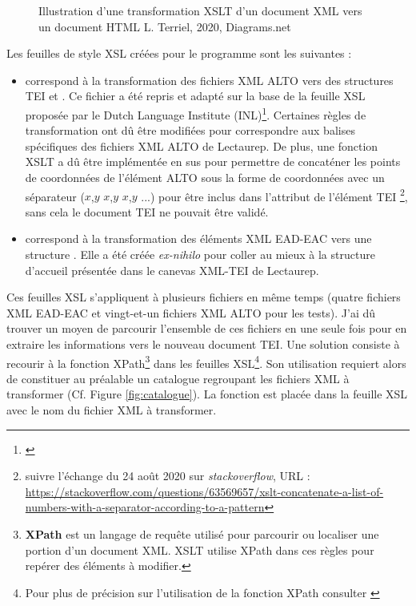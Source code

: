 \begin{figure}[h!]
    \centering
    \centerline{}
    \caption{Illustration d'une transformation XSLT d'un document XML vers un document HTML  \textcopyright L. Terriel, 2020, Diagrams.net}
    \label{fig:example_XSLT}
\end{figure}
\newpage
Les feuilles de style XSL créées pour le programme sont les suivantes : 
\begin{itemize}
    \item {} correspond à la transformation des fichiers XML ALTO vers des structures TEI  et . Ce fichier a été repris et adapté sur la base de la feuille XSL proposée par le Dutch Language Institute (INL)\footnote{\cite{dutch_language_institute_alto2tei_nodate}}. Certaines règles de transformation ont dû être modifiées pour correspondre aux balises spécifiques des fichiers XML ALTO de Lectaurep. De plus, une fonction XSLT a dû être implémentée en sus pour permettre de concaténer les points de coordonnées de l'élément ALTO  sous la forme de coordonnées avec un séparateur ($x$,$y$ $x$,$y$ $x$,$y$ ...)  pour être inclus dans l'attribut  de l'élément TEI \footnote{suivre l'échange du 24 août 2020 sur \textit{stackoverflow}, URL : \url{https://stackoverflow.com/questions/63569657/xslt-concatenate-a-list-of-numbers-with-a-separator-according-to-a-pattern}}, sans cela le document TEI ne pouvait être validé.\\ 
    \item {} correspond à la transformation des éléments XML EAD-EAC vers une structure . Elle a été créée \textit{ex-nihilo} pour coller au mieux à la structure d'accueil présentée dans le canevas XML-TEI de Lectaurep.  
\end{itemize}
\bigskip
Ces feuilles XSL s'appliquent à plusieurs fichiers en même temps (quatre fichiers XML EAD-EAC et vingt-et-un fichiers XML ALTO pour les tests). J'ai dû trouver un moyen de parcourir l'ensemble de ces fichiers en une seule fois pour en extraire les informations vers le nouveau document TEI. Une solution consiste à recourir à la fonction XPath\footnote{\textbf{XPath} est un langage de requête utilisé pour parcourir ou localiser une portion d'un document XML. XSLT utilise XPath dans ces règles pour repérer des éléments à modifier.}  dans les feuilles XSL\footnote{Pour plus de précision sur l'utilisation de la fonction XPath  consulter \cite{holmes_xpath_nodate-1}}. Son utilisation requiert alors de constituer au préalable un catalogue regroupant les fichiers XML à transformer (Cf. Figure \ref{fig:catalogue}). La fonction est placée dans la feuille XSL avec le nom du fichier XML  à transformer. 

